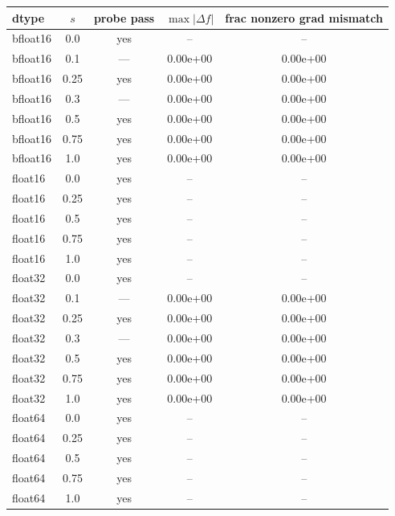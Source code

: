 \begin{tabular}{l c c c c}
\toprule
dtype & $s$ & probe pass & $\max |\Delta f|$ & frac nonzero grad mismatch \\
\midrule
bfloat16 & 0.0 & yes & -- & -- \\
bfloat16 & 0.1 & --- & 0.00e+00 & 0.00e+00 \\
bfloat16 & 0.25 & yes & 0.00e+00 & 0.00e+00 \\
bfloat16 & 0.3 & --- & 0.00e+00 & 0.00e+00 \\
bfloat16 & 0.5 & yes & 0.00e+00 & 0.00e+00 \\
bfloat16 & 0.75 & yes & 0.00e+00 & 0.00e+00 \\
bfloat16 & 1.0 & yes & 0.00e+00 & 0.00e+00 \\
float16 & 0.0 & yes & -- & -- \\
float16 & 0.25 & yes & -- & -- \\
float16 & 0.5 & yes & -- & -- \\
float16 & 0.75 & yes & -- & -- \\
float16 & 1.0 & yes & -- & -- \\
float32 & 0.0 & yes & -- & -- \\
float32 & 0.1 & --- & 0.00e+00 & 0.00e+00 \\
float32 & 0.25 & yes & 0.00e+00 & 0.00e+00 \\
float32 & 0.3 & --- & 0.00e+00 & 0.00e+00 \\
float32 & 0.5 & yes & 0.00e+00 & 0.00e+00 \\
float32 & 0.75 & yes & 0.00e+00 & 0.00e+00 \\
float32 & 1.0 & yes & 0.00e+00 & 0.00e+00 \\
float64 & 0.0 & yes & -- & -- \\
float64 & 0.25 & yes & -- & -- \\
float64 & 0.5 & yes & -- & -- \\
float64 & 0.75 & yes & -- & -- \\
float64 & 1.0 & yes & -- & -- \\
\bottomrule
\end{tabular}